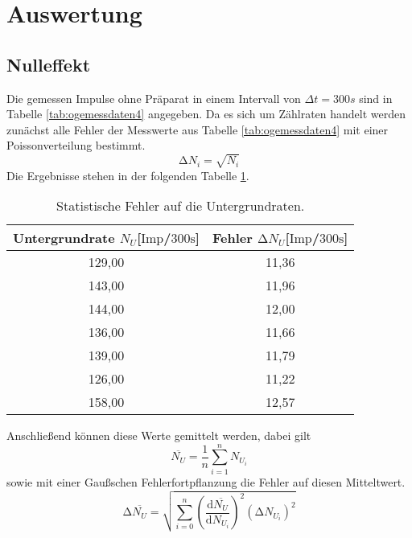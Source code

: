 \section{Auswertung}

\subsection{Nulleffekt}
Die gemessen Impulse ohne Präparat in einem Intervall von $\Delta t = 300\si{s}$ sind in Tabelle \ref{tab:ogemessdaten4} angegeben.
Da es sich um Zählraten handelt werden zunächst alle Fehler der Messwerte aus Tabelle \ref{tab:ogemessdaten4} mit einer Poissonverteilung bestimmt.
\begin{equation}
\label{eqn:poisson}
\increment N_{i} = \sqrt{N_{i}}
\end{equation}
Die Ergebnisse stehen in der folgenden Tabelle \ref{tab:fehleraufn}.
\begin{table}
\centering
\caption{Statistische Fehler auf die Untergrundraten.}
\label{tab:fehleraufn}
\begin{tabular}{c c}
    \toprule
    Untergrundrate $N_{U}$[$\text{Imp}$/$300\si{\second}$] & Fehler $\increment N_{U}$[$\text{Imp}$/$300\si{\second}$]\\
    \midrule
    129{,}00 & 11{,}36\\
    143{,}00 & 11{,}96\\
    144{,}00 & 12{,}00\\
    136{,}00 & 11{,}66\\
    139{,}00 & 11{,}79\\
    126{,}00 & 11{,}22\\ 
    158{,}00 & 12{,}57\\
    \bottomrule
\end{tabular}
\end{table}
Anschließend können diese Werte gemittelt werden, dabei gilt
\begin{equation}
\overline{N_{U}} = \frac{1}{n} \sum_{i=1}^n N_{U_{i}}
\end{equation}
sowie mit einer Gaußschen Fehlerfortpflanzung die Fehler auf diesen Mitteltwert.
\begin{equation}
\increment \overline{N_{U}} = \sqrt{\sum_{i=0}^{n} \left( \frac{\text{d}\overline{N_{U}}}{\text{d}N_{U_{i}}}\right)^{2} (\increment N_{U_{i}})^{2}}
\end{equation}
